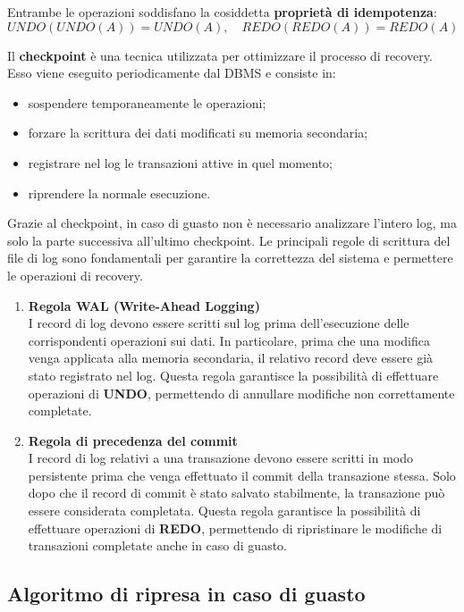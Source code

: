 Entrambe le operazioni soddisfano la cosiddetta \textbf{proprietà di idempotenza}:
\[
UNDO(UNDO(A)) = UNDO(A), \quad REDO(REDO(A)) = REDO(A)
\]

Il \textbf{checkpoint} è una tecnica utilizzata per ottimizzare il processo di recovery. 
Esso viene eseguito periodicamente dal DBMS e consiste in:

\begin{itemize}
	\item sospendere temporaneamente le operazioni;
	\item forzare la scrittura dei dati modificati su memoria secondaria;
	\item registrare nel log le transazioni attive in quel momento;
	\item riprendere la normale esecuzione.
\end{itemize}

Grazie al checkpoint, in caso di guasto non è necessario analizzare l'intero log, ma solo la parte successiva all'ultimo checkpoint.
Le principali regole di scrittura del file di log sono fondamentali per garantire la correttezza del sistema e permettere le operazioni di recovery.

\begin{enumerate}
	\item \textbf{Regola WAL (Write-Ahead Logging)} \\
	I record di log devono essere scritti sul log prima dell'esecuzione delle corrispondenti operazioni sui dati. 
	In particolare, prima che una modifica venga applicata alla memoria secondaria, il relativo record deve essere già stato registrato nel log.
	Questa regola garantisce la possibilità di effettuare operazioni di \textbf{UNDO}, permettendo di annullare modifiche non correttamente completate.
	
	\item \textbf{Regola di precedenza del commit} \\
	I record di log relativi a una transazione devono essere scritti in modo persistente prima che venga effettuato il commit della transazione stessa.
	Solo dopo che il record di commit è stato salvato stabilmente, la transazione può essere considerata completata.
	Questa regola garantisce la possibilità di effettuare operazioni di \textbf{REDO}, permettendo di ripristinare le modifiche di transazioni completate anche in caso di guasto.
\end{enumerate}
\subsection{Algoritmo di ripresa in caso di guasto}

